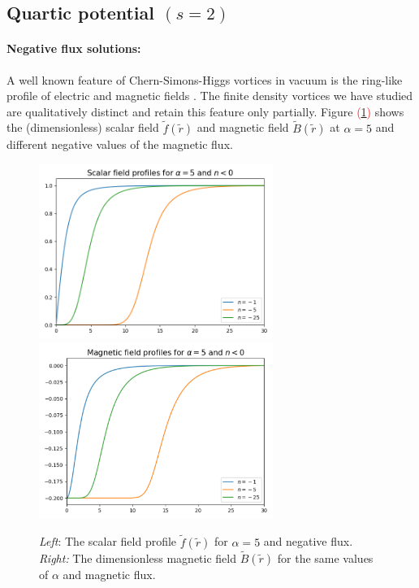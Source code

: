 \subsection{Quartic potential $(s=2)$}
\paragraph{Negative flux solutions:} A well known feature of Chern-Simons-Higgs vortices in vacuum is the ring-like profile of electric and magnetic fields \cite{Horvathy:2008hd}. The finite density vortices we have studied are qualitatively distinct and
retain this feature only partially. Figure \textcolor{red}{(}\ref{fig:scalarneg}\textcolor{red}{)}  shows the (dimensionless) scalar field $\tilde f(\tilde r)$ and magnetic field $\tilde B(\tilde r )$  at $\alpha=5$ and different negative values of the magnetic flux.
\begin{figure}[H]
\begin{center}
    \includegraphics[width=3in]{Chapter_2_Folder_1912.11321/figures/f_alpha_5_final.png}\includegraphics[width=3in]{Chapter_2_Folder_1912.11321/figures/B_alpha_5_final.pdf}
    \caption[This figure showcases the scalar and magnetic field profiles of vortices in the \textcolor{red}{a}belian Chern-Simons model at finite chemical potential and negative magnetic flux.]{ {\small{\it Left}: The scalar field profile $\tilde f(\tilde r)$ for $\alpha=5$ and negative flux. {\it Right:} The dimensionless magnetic field $\tilde B(\tilde r)$ for the same values of $\alpha$ and magnetic flux.}} \label{fig:scalarneg}
   \end{center}
\end{figure}
